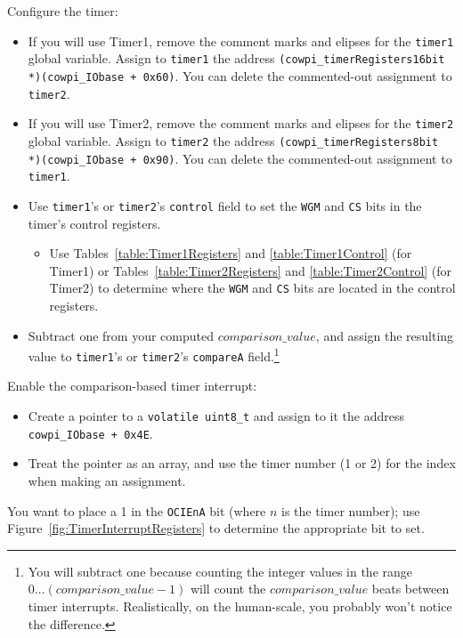 Configure the timer:
\begin{itemize}
\item If you will use Timer1, remove the comment marks and elipses for the
    \lstinline{timer1} global variable. Assign to \lstinline{timer1} the address
    \lstinline{(cowpi_timerRegisters16bit *)(cowpi_IObase + 0x60)}. You can
    delete the commented-out assignment to \lstinline{timer2}.
\item If you will use Timer2, remove the comment marks and elipses for the
    \lstinline{timer2} global variable. Assign to \lstinline{timer2} the address
    \lstinline{(cowpi_timerRegisters8bit *)(cowpi_IObase + 0x90)}. You can delete
    the commented-out assignment to \lstinline{timer1}.
\item Use \lstinline{timer1}'s or \lstinline{timer2}'s \lstinline{control} field to
    set the \texttt{WGM} and \texttt{CS} bits in the timer's control registers.
    \begin{itemize}
    \item Use Tables~\ref{table:Timer1Registers} and \ref{table:Timer1Control}
        (for Timer1) or Tables~\ref{table:Timer2Registers} and
        \ref{table:Timer2Control} (for Timer2) to determine where the
        \texttt{WGM} and \texttt{CS} bits are located in the control registers.
    \end{itemize}
\item Subtract one from your computed $comparison\_value$, and assign the
    resulting value to \lstinline{timer1}'s or \lstinline{timer2}'s
    \lstinline{compareA} field.\footnote{\label{note:subtractOne} You will
    subtract one because counting the integer values in the range
    $0\dots(comparison\_value-1)$ will count the $comparison\_value$ beats
    between timer interrupts. Realistically, on the human-scale, you probably
    won't notice the difference.}
\end{itemize}

Enable the comparison-based timer interrupt:
\begin{itemize}
\item Create a pointer to a \lstinline{volatile uint8_t} and assign to it the
    address \lstinline{cowpi_IObase + 0x4E}.
\item Treat the pointer as an array, and use the timer number (1 or 2) for the
    index when making an assignment.
\end{itemize}

You want to place a 1 in the \texttt{OCIEnA} bit (where $n$ is the timer
number); use Figure~\ref{fig:TimerInterruptRegisters} to determine the
appropriate bit to set.

